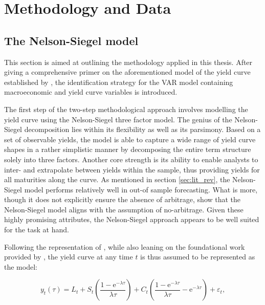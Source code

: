 \section{Methodology and Data}
\label{sec:method}

\subsection{The Nelson-Siegel model}
\label{sec:n-s_model}

This section is aimed at outlining the methodology applied in this thesis. After giving a comprehensive primer on the aforementioned model of the yield curve established by \citet{nelson1987parsimonious}, the identification strategy for the VAR model containing macroeconomic and yield curve variables is introduced.

The first step of the two-step methodological approach involves modelling the yield curve using the Nelson-Siegel three factor model. 
The genius of the Nelson-Siegel decomposition lies within its flexibility as well as its parsimony. 
Based on a set of observable yields, the model is able to capture a wide range of yield curve shapes in a rather simplistic manner by decomposing the entire term structure solely into three factors.
Another core strength is its ability to enable analysts to inter- and extrapolate between yields within the sample, thus providing yields for all maturities along the curve.
As mentioned in section \ref{sec:lit_rev}, the Nelson-Siegel model performs relatively well in out-of sample forecasting.
What is more, though it does not explicitly ensure the absence of arbitrage, \citet{coroneo2011arbitrage} show that the Nelson-Siegel model aligns with the assumption of no-arbitrage. 
Given these highly promising attributes, the Nelson-Siegel approach appears to be well suited for the task at hand.

Following the representation of \citet{diebold2006macroeconomy}, while also leaning on the foundational work provided by \citet{diebold2006forecasting}, the yield curve at any time $t$ is thus assumed to be represented as the \citet{nelson1987parsimonious} model:


\begin{equation}
\label{eq:NS_factor_interpretation}
    y_{t}(\tau)=L_{t}+S_{t}\left(\frac{1-\mathrm{e}^{-\lambda \tau}}{\lambda \tau}\right)+C_{t}\left(\frac{1-\mathrm{e}^{-\lambda \tau}}{\lambda \tau}-\mathrm{e}^{-\lambda \tau}\right) + \varepsilon_{t},
\end{equation}

